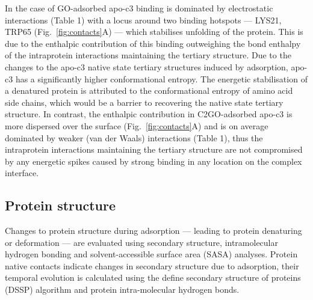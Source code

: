 \begin{table*}
\caption{Binding energy components from MM-PBSA calculations performed on the MD trajectories of adsorbed apo-c3 on GO and C2GO sheets. Stronger binding components have been highlighted in bold.} \label{table:pbsa}
\end{table*}
In the case of GO-adsorbed apo-c3 binding is dominated by electrostatic interactions (Table 1) with a locus around two binding hotspots --- LYS21, TRP65 (Fig.~\ref{fig:contacts}A) ---  which stabilises unfolding of the protein. This is due to the enthalpic contribution of this binding outweighing the bond enthalpy of the intraprotein interactions maintaining the tertiary structure. Due to the changes to the apo-c3 native state tertiary structures induced by adsorption, apo-c3 has a significantly higher conformational entropy. The energetic stabilisation of a denatured protein is attributed to the conformational entropy of amino acid side chains, which would be a barrier to recovering the native state tertiary structure.\cite{leach1998exploring} In contrast, the enthalpic contribution in C2GO-adsorbed apo-c3 is more dispersed over the surface (Fig.~\ref{fig:contacts}A) and is on average dominated by weaker (van der Waals) interactions (Table 1), thus the intraprotein interactions maintaining the tertiary structure are not compromised by any energetic spikes caused by strong binding in any location on the complex interface.
\subsection{Protein structure}
Changes to protein structure during adsorption --- leading to protein denaturing or deformation --- are evaluated using secondary structure, intramolecular hydrogen bonding and solvent-accessible surface area (SASA) analyses. Protein native contacts indicate changes in secondary structure due to adsorption, their temporal evolution is calculated using the define secondary structure of proteins (DSSP) algorithm\cite{Kabsch-1983} and protein intra-molecular hydrogen bonds. 
%

